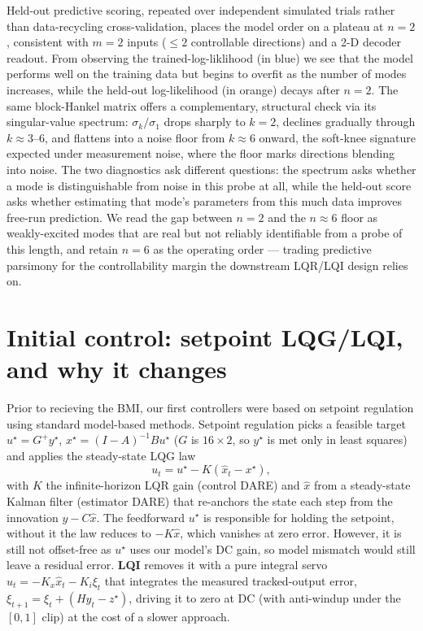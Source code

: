 \documentclass[11pt]{article}
\begin{document}
Held-out predictive scoring, repeated over independent simulated trials rather than data-recycling
cross-validation, places the model order on a plateau at $n{=}2$, consistent
with $m{=}2$ inputs ($\le 2$ controllable directions) and a 2-D decoder
readout. From observing the trained-log-liklihood (in blue) we see that the model performs well on the training data but begins to overfit as the number of modes increases, while the held-out log-likelihood (in orange) decays after $n{=}2$. The same block-Hankel matrix offers a complementary, structural check
via its singular-value spectrum: $\sigma_k/\sigma_1$ drops sharply to
$k{=}2$, declines gradually through $k{\approx}3$--$6$, and flattens into a
noise floor from $k{\approx}6$ onward, the soft-knee signature expected
under measurement noise, where the floor marks directions blending into
noise. The two diagnostics ask different questions: the spectrum asks whether
a mode is distinguishable from noise in this probe at all, while the
held-out score asks whether estimating that mode's parameters from
this much data improves free-run prediction. We read the gap between
$n{=}2$ and the $n{\approx}6$ floor as weakly-excited modes that are real but
not reliably identifiable from a probe of this length, and retain $n{=}6$ as
the operating order --- trading predictive parsimony for the controllability
margin the downstream LQR/LQI design relies on.


\section{Initial control: setpoint LQG/LQI, and why it changes}
\label{sec:lqg}
Prior to recieving the BMI, our first controllers were based on setpoint regulation using standard model-based methods.
 Setpoint regulation picks a
feasible target $u^\star=G^{+}y^\star$, $x^\star=(I-A)^{-1}Bu^\star$ ($G$ is
$16\!\times\!2$, so $y^\star$ is met only in least squares) and applies the steady-state
LQG law
\[
u_t = u^\star - K(\hat x_t - x^\star),
\]
with $K$ the infinite-horizon LQR gain (control DARE) and $\hat x$ from a steady-state
Kalman filter (estimator DARE) that re-anchors the state each step from the innovation
$y-C\hat x$. The feedforward $u^\star$ is responsible for holding the setpoint,
without it the law reduces to $-K\hat x$, which vanishes at zero error. However, it is still
not offset-free as $u^\star$ uses our model's DC gain, so model mismatch would still leave a residual error.
\textbf{LQI} removes it with a pure integral servo $u_t=-K_x\hat x_t-K_i\xi_t$ that integrates the
measured tracked-output error, $\xi_{t+1}=\xi_t+(Hy_t-z^\star)$, driving it to
zero at DC (with anti-windup under the $[0,1]$ clip) at the cost of a slower approach.
\end{document}
